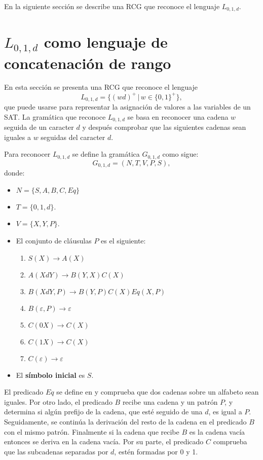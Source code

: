 \documentclass[12pt]{article}
\begin{document}
En la siguiente sección se describe una RCG que reconoce el lenguaje $L_{0,1,d}$.

\section{$L_{0,1,d}$ como lenguaje de concatenación de rango}

En esta sección se presenta una RCG que reconoce el lenguaje $$L_{0,1,d}=\{(wd)^+\,|\,w\in\{0,1\}^+\},$$ que puede usarse para representar la asignación de valores a las variables de un SAT. La gramática que reconoce $L_{0,1,d}$ se basa en reconocer una cadena $w$ seguida de un caracter $d$ y después comprobar que las siguientes cadenas sean iguales a $w$ seguidas del caracter $d$.

Para reconocer $L_{0,1,d}$ se define la gramática $G_{0,1,d}$ como sigue:
\[
    G_{0,1,d} = (N, T, V, P, S),
\]
donde:

\begin{itemize}
    \item $N=\{S,A,B,C,Eq\}$
    \item $T=\{0,1,d\}$.
    \item $V=\{X,Y,P\}$.
    \item El conjunto de cláusulas $P$ es el siguiente:
          \begin{enumerate}
              \item $S(X)\to A(X)$
              \item $A(XdY)\to B(Y,X)C(X)$
              \item $B(XdY,P)\to B(Y,P) C(X) Eq(X,P)$
              \item $B(\varepsilon,P)\to \varepsilon$
              \item $C(0X)\to C(X)$
              \item $C(1X)\to C(X)$
              \item $C(\varepsilon)\to \varepsilon$
          \end{enumerate}
    \item El \textbf{símbolo inicial} es $S$.
\end{itemize}

El predicado $Eq$ se define en \cite{mainRCGBib} y comprueba que dos cadenas sobre un alfabeto sean iguales.  Por otro lado, el predicado $B$ recibe una cadena y un patrón $P$, y determina si algún prefijo de la cadena, que esté seguido de una $d$, es igual a $P$. Seguidamente, se continúa la derivación del resto de la cadena en el predicado $B$ con el mismo patrón. Finalmente si la cadena que recibe $B$ es la cadena vacía entonces se deriva en la cadena vacía. Por su parte, el predicado $C$ comprueba que las subcadenas separadas por $d$, estén formadas por 0 y 1.
\end{document}
